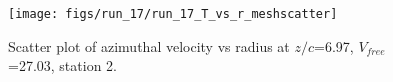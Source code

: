 \begin{figure}[H]
\centering
\texttt{[image: figs/run\_17/run\_17\_T\_vs\_r\_meshscatter]}
\caption{Scatter plot of azimuthal velocity vs radius at $z/c$=6.97, $V_{free}$=27.03, station 2.}
\label{fig:run_17_T_vs_r_meshscatter}
\end{figure}



